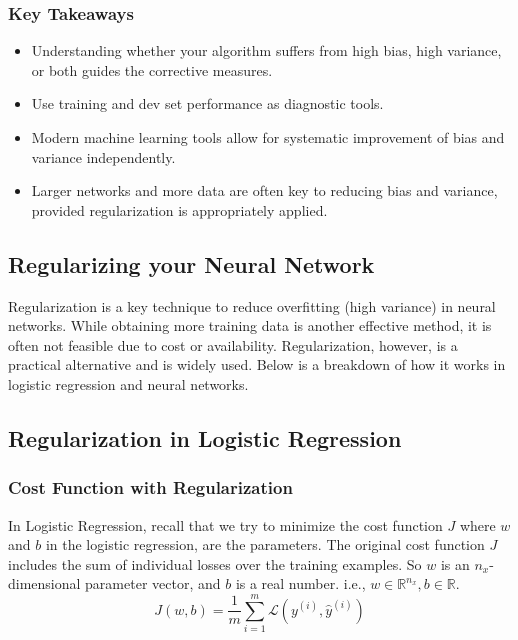 \documentclass[letterpaper,12pt,notitlepage,twoside]{report}
\begin{document}
\subsubsection{Key Takeaways}
\begin{itemize}
    \item Understanding whether your algorithm suffers from high bias, high variance, or both guides the corrective measures.
    \item Use training and dev set performance as diagnostic tools.
    \item Modern machine learning tools allow for systematic improvement of bias and variance independently.
    \item Larger networks and more data are often key to reducing bias and variance, provided regularization is appropriately applied.
\end{itemize}

\subsection{Regularizing your Neural Network}
Regularization is a key technique to reduce overfitting (high variance) in neural networks. While obtaining more training data is another effective method, it is often not feasible due to cost or availability. Regularization, however, is a practical alternative and is widely used. Below is a breakdown of how it works in logistic regression and neural networks.

\subsection*{Regularization in Logistic Regression}
\subsubsection*{Cost Function with Regularization}
In Logistic Regression, recall that we try to minimize the cost function $J$ where $w$ and $b$ in the logistic regression, are the parameters. The original cost function \( J \) includes the sum of individual losses over the training examples. So $w$ is an $n_x$-dimensional parameter vector, and $b$ is a real number. i.e., $w \in \mathbb{R}^{n_x}, b \in \mathbb{R}$.
\begin{equation}
J (w, b) = \frac{1}{m} \sum_{i=1}^m \mathcal{L} (y^{(i)}, \hat{y}^{(i)})
\end{equation}
\end{document}
